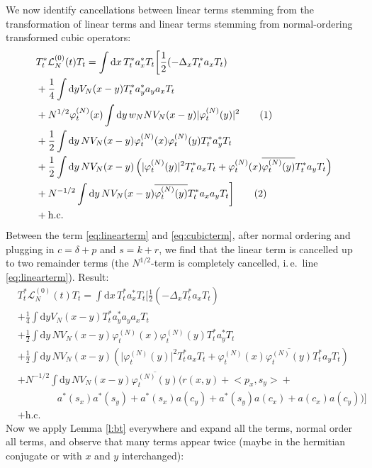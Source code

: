 \documentclass[11pt,a4paper]{scrartcl}
\newcommand{\di}{\textrm{d}}		%
\newcommand{\Lcal}{\mathcal{L}}		%
\newcommand{\hc}{\mbox{h.c.}}		%
\newcommand{\scal}[2]{\big<#1,#2\big>} %
\newcommand{\cc}[1]{\overline{#1}}	%
\newcommand{\ph}{\varphi_t^{(N)}}	%
\newcommand{\tagg}[1]{ \stepcounter{equation} \tag{\theequation} \label{eq:#1} } %
\newcommand{\eqr}[1]{\eqref{eq:#1}}			%
\begin{document}
We now identify cancellations between linear terms stemming from the transformation of linear terms and linear terms stemming from normal-ordering transformed cubic operators:
\begin{align*}
& T^*_t \Lcal^{(0)}_N(t) T_t = \int \di x\, T^*_t a^*_x T_t \bigg[   \frac{1}{2}(-\Delta_x T^*_t a_x T_t) \\
& + \frac{1}{4}\int \di y V_N(x-y) T^*_t a^*_y a_y a_x T_t \\
& + N^{1/2} \ph(x) \int \di y\, w_N N V_N(x-y) \lvert \ph(y) \rvert^2 \tagg{linearterm} \\
& + \frac{1}{2} \int \di y\, NV_N(x-y)  \ph(x) \ph(y)  T^*_t a^*_y T_t \\
& + \frac{1}{2} \int \di y\, NV_N(x-y) \left(  \lvert \ph(y)\rvert^2 T^*_t a_x T_t + \ph(x) \cc{\ph(y)} T^*_t a_y T_t  \right) \\
& + N^{-1/2} \int \di y\, NV_N(x-y) \cc{\ph(y)} T^*_t a_x a_y T_t  \bigg]\tagg{cubicterm} \\
& + \hc
\end{align*}
Between the term \eqr{linearterm} and \eqr{cubicterm}, after normal ordering and plugging in $c = \delta + p$ and $s = k + r$, we find that the linear term is cancelled up to two remainder terms (the $N^{1/2}$-term is completely cancelled, i.\,e.\ line \eqr{linearterm}). Result:
\begin{align*}
& T^*_t \Lcal^{(0)}_N(t) T_t = \int \di x\, T^*_t a^*_x T_t \bigg[   \frac{1}{2}(-\Delta_x T^*_t a_x T_t) \\
& + \frac{1}{4}\int \di y V_N(x-y) T^*_t a^*_y a_y a_x T_t \\
& + \frac{1}{2} \int \di y\, NV_N(x-y)  \ph(x) \ph(y)  T^*_t a^*_y T_t \\
& + \frac{1}{2} \int \di y\, NV_N(x-y) \left(  \lvert \ph(y)\rvert^2 T^*_t a_x T_t + \ph(x) \cc{\ph(y)} T^*_t a_y T_t  \right) \\
& + N^{-1/2} \int \di y\, NV_N(x-y) \cc{\ph(y)} \bigg( r(x,y) + \scal{p_x}{s_y} + \\
& \qquad \qquad  a^*(s_x) a^*(s_y) + a^*(s_x) a(c_y)  + a^*(s_y) a(c_x) + a(c_x) a(c_y)  \bigg)  \bigg] \\
& + \hc
\end{align*}
Now we apply Lemma \ref{l:bt} everywhere and expand all the terms, normal order all terms, and observe that many terms appear twice (maybe in the hermitian conjugate or with $x$ and $y$ interchanged):
\end{document}

